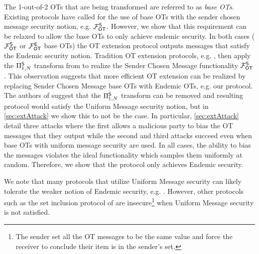 The 1-out-of-2 OTs that are being transformed are referred to as \emph{base OTs}. Existing protocols \cite{C:IKNP03,EC:ALSZ15,C:KelOrsSch15,RSA:OrrOrsSch17} have called for the use of base OTs with the sender chosen message security notion, e.g. $\mathcal{F}_{\mathsf{OT}}^\mathsf{S}$. However, we show that this requirement can be relaxed to allow the base OTs to only achieve endemic security. In both cases ($\mathcal{F}_{\mathsf{OT}}^\mathsf{S}$ or $\mathcal{F}_{\mathsf{OT}}^\mathsf{E}$ base OTs) the OT extension protocol outputs messages that satisfy the Endemic security notion.  Tradition OT extension protocols, e.g. \cite{C:IKNP03,EC:ALSZ15,C:KelOrsSch15}, then apply the $\Pi^{\mathsf{S}}_{1,N}$ transform from  to realize the Sender Chosen Message functionality $\mathcal{F}_{\mathsf{OT}}^\mathsf{S}$.
\iffullversion
 This observation suggests that more efficient OT extension can be realized by replacing Sender Chosen Message base OTs with Endemic OTs, e.g. our protocol.
\fi
The authors of \cite{C:KelOrsSch15,RSA:OrrOrsSch17} suggest that the $\Pi^{\mathsf{S}}_{1,N}$ transform  can be removed and resulting protocol would satisfy the Uniform Message security notion, but in  \ref{sec:extAttack} we show this to not be the case. 
\iffullversion
In particular, \ref{sec:extAttack} detail three attacks where the first  allows a malicious party to bias the OT messages that they output while the second and third attacks succeed even when base OTs with uniform message security are used. In all cases, the ability to bias the messages violates the ideal functionality which samples them uniformly at random. Therefore, we show that the protocol only achieves Endemic security.

We note that many protocols that utilize Uniform Message security can likely tolerate the weaker notion of Endemic security, e.g. \cite{EC:RinRos17,CCS:RinRos17}.  However, other protocols such as the set inclusion protocol of \cite[Figure 5]{RSA:OrrOrsSch17} are insecure\footnote{The sender set all the OT messages to be the same value and force the receiver to conclude their item is in the sender's set.} when Uniform Message security is not satisfied. 
\fi

